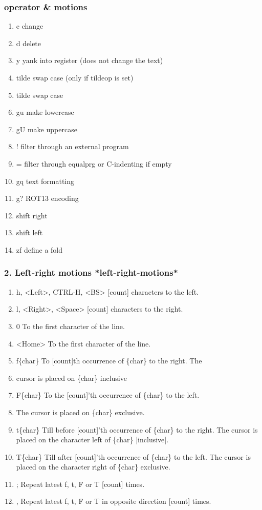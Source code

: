 \documentclass{beamer}
\begin{document}
\begin{frame}
  \frametitle{operator \& motions}
  \begin{enumerate}
    \item c	change
    \item d	delete
    \item y	yank into register (does not change the text)
    \item tilde swap case (only if tildeop is set)
    \item tilde	swap case
    \item gu	make lowercase
    \item gU	make uppercase
    \item !	filter through an external program
    \item =	filter through equalprg or C-indenting if empty
    \item gq	text formatting
    \item g?	ROT13 encoding
    \item 	shift right
    \item 	shift left
    \item zf	define a fold
  \end{enumerate}
\end{frame}

\begin{frame}
  \frametitle{2. Left-right motions					*left-right-motions*}

  \begin{enumerate}
    \item h, <Left>, CTRL-H, <BS>			[count] characters to the left.
    \item l, <Right>, <Space>			[count] characters to the right.
    \item 0			To the first character of the line.
    \item <Home>			To the first character of the line.
    \item f\{char\}			To [count]th occurrence of \{char\} to the right.  The
    \item 			cursor is placed on \{char\} inclusive
    \item F\{char\}			To the [count]'th occurrence of \{char\} to the left.
    \item 			The cursor is placed on \{char\} exclusive.
    \item t\{char\}			Till before [count]'th occurrence of \{char\} to the
      right.  The cursor is placed on the character left of
      \{char\} |inclusive|.
    \item T\{char\}			Till after [count]'th occurrence of \{char\} to the left.  The cursor is placed on the character right of \{char\} exclusive.
    \item ;			Repeat latest f, t, F or T [count] times.
    \item ,			Repeat latest f, t, F or T in opposite direction [count] times.
  \end{enumerate}
\end{frame}
\end{document}
